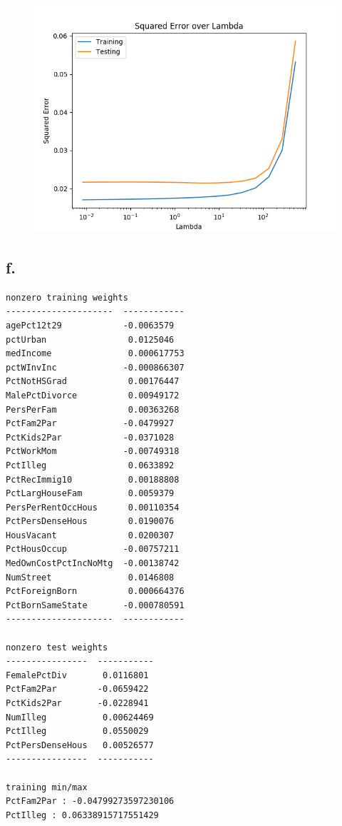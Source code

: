 \documentclass{article}
\newcommand{\1}{\mathbf{1}}
\begin{document}
{\begin{figure}[ht!]
  \centering
  \includegraphics[width=120mm]{../hw2-code/results/a5_e.png}
\end{figure}

\newpage

\subsection*{f.}

\begin{verbatim}
nonzero training weights
---------------------  ------------
agePct12t29            -0.0063579
pctUrban                0.0125046
medIncome               0.000617753
pctWInvInc             -0.000866307
PctNotHSGrad            0.00176447
MalePctDivorce          0.00949172
PersPerFam              0.00363268
PctFam2Par             -0.0479927
PctKids2Par            -0.0371028
PctWorkMom             -0.00749318
PctIlleg                0.0633892
PctRecImmig10           0.00188808
PctLargHouseFam         0.0059379
PersPerRentOccHous      0.00110354
PctPersDenseHous        0.0190076
HousVacant              0.0200307
PctHousOccup           -0.00757211
MedOwnCostPctIncNoMtg  -0.00138742
NumStreet               0.0146808
PctForeignBorn          0.000664376
PctBornSameState       -0.000780591
---------------------  ------------

nonzero test weights
----------------  -----------
FemalePctDiv       0.0116801
PctFam2Par        -0.0659422
PctKids2Par       -0.0228941
NumIlleg           0.00624469
PctIlleg           0.0550029
PctPersDenseHous   0.00526577
----------------  -----------

training min/max
PctFam2Par : -0.04799273597230106
PctIlleg : 0.06338915717551429


\end{verbatim}}
\end{document}

